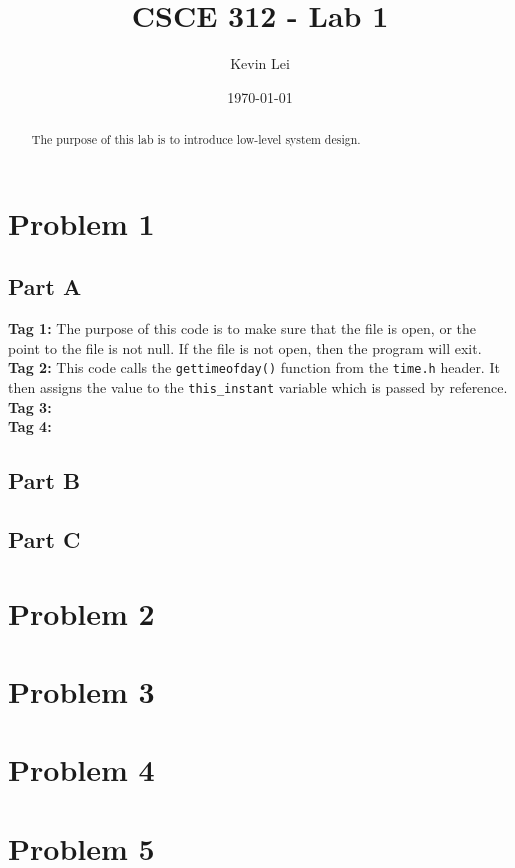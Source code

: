 \documentclass{article}
\title{CSCE 312 - Lab 1}
\author{Kevin Lei}
\date{\today}
\begin{document}
\maketitle

\begin{abstract}
The purpose of this lab is to introduce low-level system design.
\end{abstract}

\section{Problem 1}

\subsection{Part A}
\textbf{Tag 1: } The purpose of this code is to make sure that the file is open, or the point to the file is not null. 
If the file is not open, then the program will exit.\\
\textbf{Tag 2: } This code calls the \lstinline!gettimeofday()! function from the \lstinline!time.h! header.
It then assigns the value to the \lstinline!this_instant! variable which is passed by reference. \\
\textbf{Tag 3: } \\
\textbf{Tag 4: } \\

\subsection{Part B}

\subsection{Part C}


\section{Problem 2}

\section{Problem 3}

\section{Problem 4}

\section{Problem 5}
\end{document}
